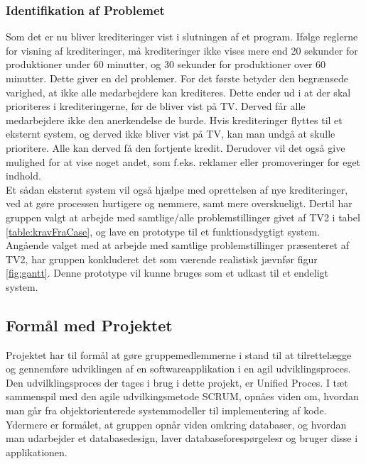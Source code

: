 \subsubsection{Identifikation af Problemet}
Som det er nu bliver krediteringer vist i slutningen af et program. Ifølge reglerne for visning af krediteringer, må krediteringer ikke vises mere end 20 sekunder for produktioner under 60 minutter, og 30 sekunder for produktioner over 60 minutter. Dette giver en del problemer. For det første betyder den begrænsede varighed, at ikke alle medarbejdere kan krediteres. Dette ender ud i at der skal prioriteres i krediteringerne, før de bliver vist på TV. Derved får alle medarbejdere ikke den anerkendelse de burde.
Hvis krediteringer flyttes til et eksternt system, og derved ikke bliver vist på TV, kan man undgå at skulle prioritere. Alle kan derved få den fortjente kredit. Derudover vil det også give mulighed for at vise noget andet, som f.eks. reklamer eller promoveringer for eget indhold. \cite{DR-Krediteringsregler} \\

\noindent
Et sådan eksternt system vil også hjælpe med oprettelsen af nye krediteringer, ved at gøre processen hurtigere og nemmere, samt mere overskueligt. Dertil har gruppen valgt at arbejde med samtlige/alle problemstillinger givet af TV2 i tabel \ref{table:kravFraCase}, og lave en prototype til et funktionsdygtigt system. Angående valget med at arbejde med samtlige problemstillinger præsenteret af TV2, har gruppen konkluderet det som værende realistisk jævnfør figur \ref{fig:gantt}. Denne prototype vil kunne bruges som et udkast til et endeligt system.


\subsection{Formål med Projektet}
Projektet har til formål at gøre gruppemedlemmerne i stand til at tilrettelægge og gennemføre udviklingen af en softwareapplikation i en agil udviklingsproces. Den udvilklingsproces der tages i brug i dette projekt, er Unified Proces. I tæt sammenspil med den agile udvilkingsmetode SCRUM, opnåes viden om, hvordan man går fra objektorienterede systemmodeller til implementering af kode. Ydermere er formålet, at gruppen opnår viden omkring databaser, og hvordan man udarbejder et databasedesign, laver databaseforespørgelesr og bruger disse i applikationen.


